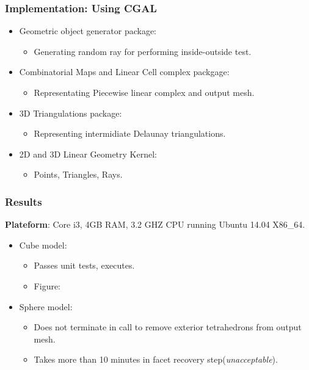 \documentclass{beamer}
\begin{document}
	\begin{frame}
		\frametitle{Implementation: Using CGAL}
			\begin{itemize}
				\item Geometric object generator package:
					\begin{itemize}
						\item Generating random ray for performing inside-outside test.	
					\end{itemize}
				\item Combinatorial Maps and Linear Cell complex packgage:
					\begin{itemize}
						\item Representating Piecewise linear complex and output mesh.	
					\end{itemize}
				\item 3D Triangulations package:
					\begin{itemize}
						\item Representing intermidiate Delaunay triangulations.	
					\end{itemize}		
				\item 2D and 3D Linear Geometry Kernel:
					\begin{itemize}
						\item Points, Triangles, Rays.	
					\end{itemize}		
			\end{itemize}		
	\end{frame}	
	\begin{frame}
		\frametitle{Results} 	
		\textbf{Plateform}: Core i3, 4GB RAM, 3.2 GHZ CPU running Ubuntu 14.04 X86\_64.	
			\begin{itemize}
				\item Cube model:
					\begin{itemize}
						\item Passes unit tests, executes.
						\item Figure:
					\end{itemize}
				\item Sphere model:
					\begin{itemize}
						\item Does not terminate in call to remove exterior tetrahedrons from output mesh.
						\item Takes more than 10 minutes in facet recovery step(\textit{unacceptable}).
					\end{itemize}		
			\end{itemize}		
	\end{frame}	
\end{document}
